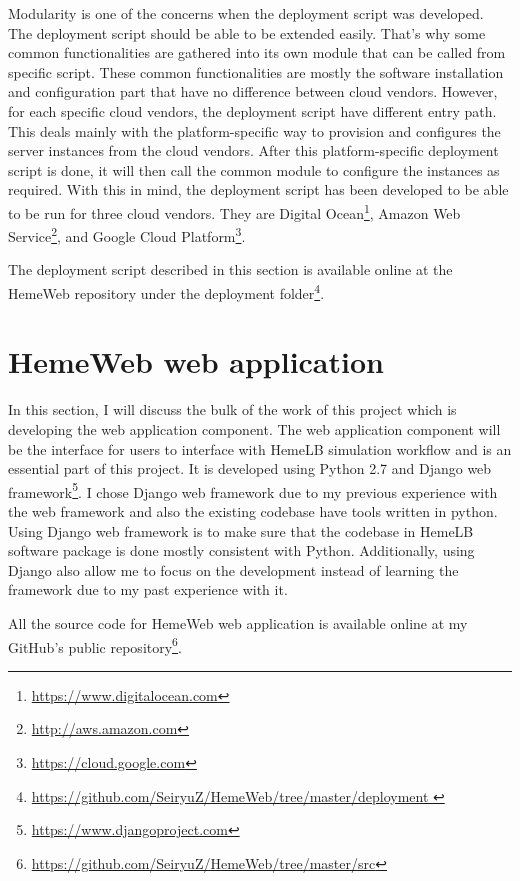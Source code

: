 Modularity is one of the concerns when the deployment script was developed. The deployment script should be able to be extended easily. That's why some common functionalities are gathered into its own module that can be called from specific script. These common functionalities are mostly the software installation and configuration part that have no difference between cloud vendors. However, for each specific cloud vendors, the deployment script have different entry path. This deals mainly with the platform-specific way to provision and configures the server instances from the cloud vendors. After this platform-specific deployment script is done, it will then call the common module to configure the instances as required. With this in mind, the deployment script has been developed to be able to be run for three cloud vendors. They are Digital Ocean\footnote{\url{https://www.digitalocean.com}}, Amazon Web Service\footnote{\url{http://aws.amazon.com}}, and Google Cloud Platform\footnote{\url{https://cloud.google.com}}.

The deployment script described in this section is available online at the HemeWeb repository under the deployment folder\footnote{\url{https://github.com/SeiryuZ/HemeWeb/tree/master/deployment }}.




\section{HemeWeb web application}

In this section, I will discuss the bulk of the work of this project which is developing the web application component. The web application component will be the interface for users to interface with HemeLB simulation workflow and is an essential part of this project. It is developed using Python 2.7 and Django web framework\footnote{\url{https://www.djangoproject.com}}. I chose Django web framework due to my previous experience with the web framework and also the existing codebase have tools written in python. Using Django web framework is to make sure that the codebase in HemeLB software package is done mostly consistent with Python. Additionally, using Django also allow me to focus on the development instead of learning the framework due to my past experience with it.

All the source code for HemeWeb web application is available online at my GitHub's public repository\footnote{\url{https://github.com/SeiryuZ/HemeWeb/tree/master/src}}.



